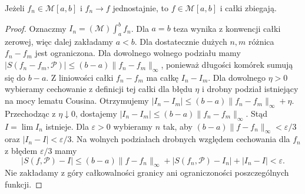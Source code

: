 \begin{wniosek}\label{it:cor:mcshane-uniform}
Jeżeli $f_n\in\mathcal M[a,b]$ i $f_n\to f$ jednostajnie,
to $f\in\mathcal M[a,b]$ i całki zbiegają.
\end{wniosek}
\begin{proof}
Oznaczmy $I_n=(\mathcal M)\int_a^b f_n$.
Dla $a=b$ teza wynika z konwencji całki zerowej,
więc dalej zakładamy $a<b$.
Dla dostatecznie dużych $n,m$ różnica $f_n-f_m$ jest
ograniczona. Dla dowolnego wolnego podziału mamy
$|S(f_n-f_m,\mathcal P)|\le(b-a)\|f_n-f_m\|_\infty$,
ponieważ długości komórek sumują się do $b-a$.
Z liniowości całki $f_n-f_m$ ma całkę $I_n-I_m$.
Dla dowolnego $\eta>0$ wybieramy cechowanie z definicji
tej całki dla błędu $\eta$ i drobny podział istniejący
na mocy lematu Cousina. Otrzymujemy
$|I_n-I_m|\le(b-a)\|f_n-f_m\|_\infty+\eta$.
Przechodząc z $\eta\downarrow0$, dostajemy
$|I_n-I_m|\le(b-a)\|f_n-f_m\|_\infty$.
Stąd $I=\lim I_n$ istnieje. Dla $\varepsilon>0$ wybieramy
$n$ tak, aby $(b-a)\|f-f_n\|_\infty<\varepsilon/3$
oraz $|I_n-I|<\varepsilon/3$. Na wolnych podziałach
drobnych względem cechowania dla $f_n$ z błędem
$\varepsilon/3$ mamy
\[
 |S(f,\mathcal P)-I|
 \le (b-a)\|f-f_n\|_\infty+|S(f_n,\mathcal P)-I_n|
     +|I_n-I|<\varepsilon.
\]
Nie zakładamy z góry całkowalności granicy ani ograniczoności
poszczególnych funkcji.
\end{proof}

